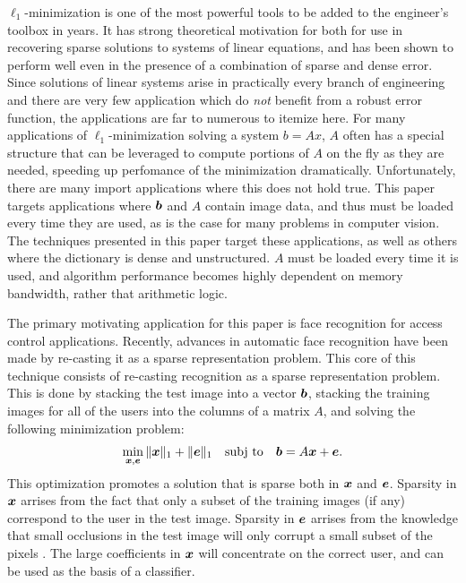 \documentclass[10pt,twocolumn,letterpaper]{article}
\begin{document}
$\ell_1$-minimization is one of the most powerful tools to be added to the engineer's
toolbox in years.  It has strong theoretical motivation for both for use in recovering sparse
solutions to systems of linear equations, and has been shown to perform well even in the
presence of a combination of sparse and dense error.  Since solutions of linear systems
arise in practically every branch of engineering and there are very few application which
do {\em not} benefit from a robust error function, the applications are far to numerous to
itemize here.  
For many applications of $\ell_1$-minimization solving a system $b=Ax$, $A$ often has a
special structure that can be leveraged to compute portions of $A$ on the fly
as they are needed, speeding up perfomance of the minimization dramatically.
Unfortunately, there are many import applications where this does not hold true.
This paper targets applications where $\boldsymbol{b}$ and $A$ contain
image data, and thus must be loaded every time they are used, as is the 
case for many problems in computer vision.
The techniques presented in this paper target these applications, as well
as others where the dictionary is dense and unstructured. $A$ must be loaded every time
it is used, and algorithm performance becomes highly dependent on memory bandwidth, rather
that arithmetic logic.

The primary motivating application for this paper is face recognition for access control applications.
Recently, advances in automatic face recognition have been made by re-casting
it as a sparse representation problem.  This core of this technique consists of
re-casting recognition as a sparse representation problem. This is done by  
stacking the test image into a vector $\boldsymbol{b}$, stacking the training images for
all of the users into the columns of a matrix $A$, and solving the following
minimization problem:
\begin{equation}
\min_{{\boldsymbol{x}}, \boldsymbol{e}} \| {\boldsymbol{x}} \|_1 + \|\boldsymbol{e}\|_1 \quad \textup{subj to} \quad \boldsymbol{b} = A {\boldsymbol{x}} + \boldsymbol{e}.
\end{equation}
This optimization promotes a solution that is sparse both in ${\boldsymbol{x}}$ and $\boldsymbol{e}$. 
Sparsity in ${\boldsymbol{x}}$ arrises from the fact that only a subset of the training images (if any)
correspond to the user in the test image.  Sparsity in $\boldsymbol{e}$ arrises from the knowledge
that small occlusions in the test image will only corrupt a small subset of the pixels \cite{Wright2009-PAMI}.
The large coefficients in ${\boldsymbol{x}}$ will concentrate on the correct user, and can be used as the basis of a classifier.
\end{document}

